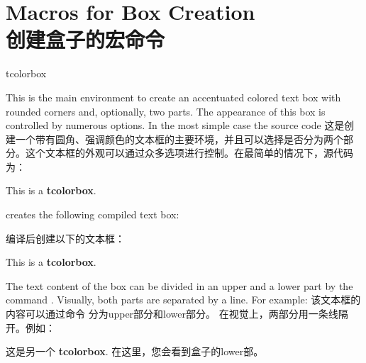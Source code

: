 
\section{Macros for Box Creation\\创建盒子的宏命令}%



%
\begin{docEnvironment}{tcolorbox}{}
\begin{stripedbox}
This is the main environment to create an accentuated colored text box with
rounded corners and, optionally, two parts. The appearance of this box
is controlled by numerous options.
In the most simple case the source code
\tcblower
这是创建一个带有圆角、强调颜色的文本框的主要环境，并且可以选择是否分为两个部分。这个文本框的外观可以通过众多选项进行控制。在最简单的情况下，源代码为：
\end{stripedbox}

\begin{dispListing}
\begin{tcolorbox}
This is a \textbf{tcolorbox}.
\end{tcolorbox}
\end{dispListing}

creates the following compiled text box:

编译后创建以下的文本框：%

\begin{tcolorbox}
This is a \textbf{tcolorbox}.
\end{tcolorbox}

\begin{stripedbox}
The text content of the box can be divided
in an upper and a lower part
by the command . Visually, both parts are separated by a line.
For example:
\tcblower
该文本框的内容可以通过命令  分为upper部分和lower部分。 在视觉上，两部分用一条线隔开。例如：
\end{stripedbox}

\begin{dispListing}
\begin{tcolorbox}
这是另一个 \textbf{tcolorbox}.
\tcblower
在这里，您会看到盒子的lower部。
\end{tcolorbox}
\end{dispListing}


\end{docEnvironment}
